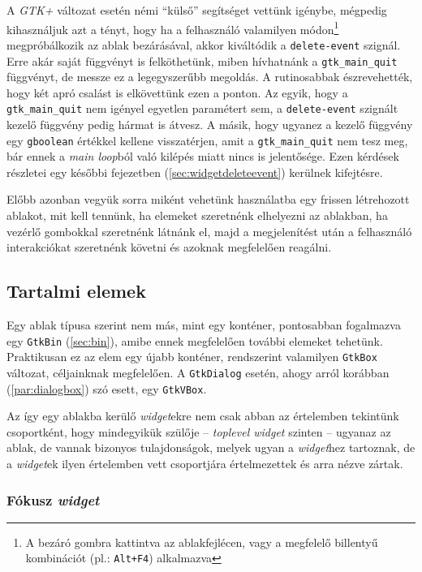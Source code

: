 \label{par:widgetdeleteevent}
A \textit{GTK+} változat esetén némi ``külső'' segítséget vettünk igénybe, mégpedig kihasználjuk azt a tényt, hogy ha a felhasználó valamilyen módon\footnote{A bezáró gombra kattintva az ablakfejlécen, vagy a megfelelő billentyű kombinációt (pl.: \texttt{Alt+F4}) alkalmazva} megpróbálkozik az ablak bezárásával, akkor kiváltódik a \texttt{delete-event} szignál. Erre akár saját függvényt is felköthetünk, miben hívhatnánk a \texttt{gtk\_main\_quit} függvényt, de messze ez a legegyszerűbb megoldás. A rutinosabbak észrevehették, hogy két apró csalást is elkövettünk ezen a ponton. Az egyik, hogy a \texttt{gtk\_main\_quit} nem igényel egyetlen paramétert sem, a \texttt{delete-event} szignált kezelő függvény pedig hármat is átvesz. A másik, hogy ugyanez a kezelő függvény egy \texttt{gboolean} értékkel kellene visszatérjen, amit a \texttt{gtk\_main\_quit} nem tesz meg, bár ennek a \textit{main loop}ból való kilépés miatt nincs is jelentősége. Ezen kérdések részletei egy későbbi fejezetben (\ref{sec:widgetdeleteevent}) kerülnek kifejtésre.

Előbb azonban vegyük sorra miként vehetünk használatba egy frissen létrehozott ablakot, mit kell tennünk, ha elemeket szeretnénk elhelyezni az ablakban, ha vezérlő gombokkal szeretnénk látnánk el, majd a megjelenítést után a felhasználó interakciókat szeretnénk követni és azoknak megfelelően reagálni.

\subsection{Tartalmi elemek}

Egy ablak típusa szerint nem más, mint egy konténer, pontosabban fogalmazva egy \texttt{GtkBin} (\ref{sec:bin}), amibe ennek megfelelően további elemeket tehetünk. Praktikusan ez az elem egy újabb konténer, rendszerint valamilyen \texttt{GtkBox} változat, céljainknak megfelelően. A \texttt{GtkDialog} esetén, ahogy arról korábban (\ref{par:dialogbox}) szó esett, egy \texttt{GtkVBox}.

Az így egy ablakba kerülő \textit{widget}ekre nem csak abban az értelemben tekintünk csoportként, hogy mindegyikük szülője -- \textit{toplevel widget} szinten -- ugyanaz az ablak, de vannak bizonyos tulajdonságok, melyek ugyan a \textit{widget}hez tartoznak, de a \textit{widget}ek ilyen értelemben vett csoportjára értelmezettek és arra nézve zártak.

\subsubsection{Fókusz \textit{widget}}
\label{sec:widgetfocus}

